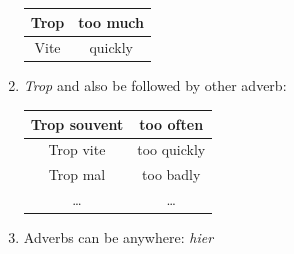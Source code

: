 \documentclass{book}
\begin{document}
\begin{enumerate}
\begin{center}
\begin{tabular}{|c|c|}
                        Trop & too much \\
                        \hline
                        Vite & quickly \\
                        \hline
                    \end{tabular}
                \end{center}
            \item \textit{Trop} and also be followed by other adverb:
                \begin{center}
                    \begin{tabular}{|c|c|}
                        \hline
                        Trop souvent & too often \\
                        \hline
                        Trop vite & too quickly \\
                        \hline
                        Trop mal & too badly \\
                        \hline
                        \dots & \dots \\
                        \hline
                    \end{tabular}
                \end{center}
            \item Adverbs can be anywhere: \textit{hier}
        \end{enumerate}
\end{document}
